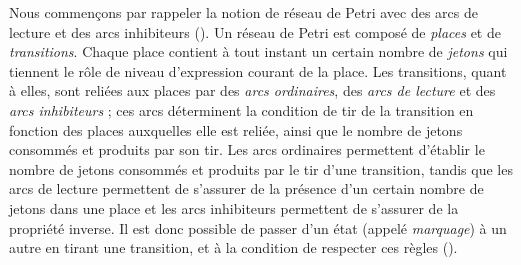\myskip

Nous commençons par rappeler la notion de réseau de Petri avec des arcs de lecture
et des arcs inhibiteurs ().
Un réseau de Petri est composé de \emph{places} et de \emph{transitions}.
Chaque place contient à tout instant un certain nombre de \emph{jetons} qui tiennent le rôle
de niveau d'expression courant de la place.
Les transitions, quant à elles, sont reliées aux places par des \emph{arcs ordinaires},
des \emph{arcs de lecture} et des \emph{arcs inhibiteurs} ;
ces arcs déterminent la condition de tir de la transition en fonction des places auxquelles
elle est reliée, ainsi que le nombre de jetons consommés et produits par son tir.
Les arcs ordinaires permettent d'établir le nombre de jetons consommés
et produits par le tir d'une transition, tandis que
les arcs de lecture permettent de s'assurer de la présence d'un certain nombre de jetons
dans une place et les arcs inhibiteurs permettent de s'assurer de la propriété
inverse.
Il est donc possible de passer d'un état (appelé \emph{marquage}) à un autre
en tirant une transition, et à la condition de respecter ces règles ().

